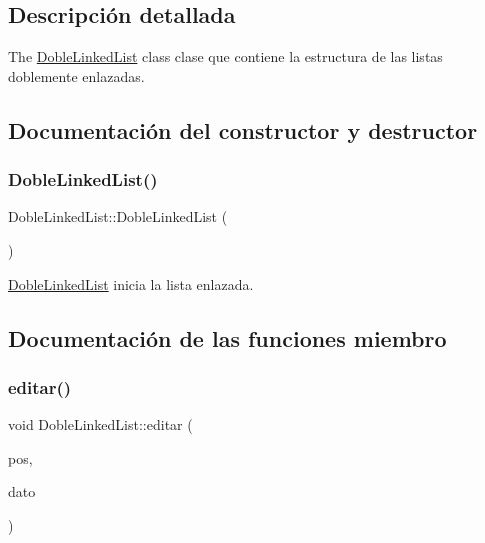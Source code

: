 \subsection{Descripción detallada}
The \mbox{\hyperlink{class_doble_linked_list}{Doble\+Linked\+List}} class clase que contiene la estructura de las listas doblemente enlazadas. 

\subsection{Documentación del constructor y destructor}
\mbox{\label{class_doble_linked_list_ae9672b17f11b4594112e9aa0166564ba}} 
\subsubsection{\texorpdfstring{Doble\+Linked\+List()}{DobleLinkedList()}}
{\footnotesize\ttfamily Doble\+Linked\+List\+::\+Doble\+Linked\+List (\begin{DoxyParamCaption}{ }\end{DoxyParamCaption})\hspace{0.3cm}{\ttfamily [inline]}}



\mbox{\hyperlink{class_doble_linked_list}{Doble\+Linked\+List}} inicia la lista enlazada. 



\subsection{Documentación de las funciones miembro}
\mbox{\label{class_doble_linked_list_ac38404371034c6f3d41a93331e51b2a0}} 
\subsubsection{\texorpdfstring{editar()}{editar()}}
{\footnotesize\ttfamily void Doble\+Linked\+List\+::editar (\begin{DoxyParamCaption}\item[{int}]{pos,  }\item[{Q\+String}]{dato }\end{DoxyParamCaption})\hspace{0.3cm}{\ttfamily [inline]}}



